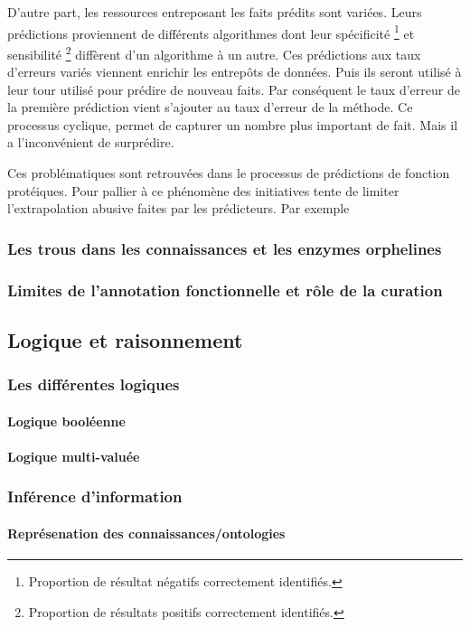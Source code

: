 \begin{refsection}
    D’autre part, les ressources entreposant les faits prédits sont variées. Leurs prédictions proviennent  de différents algorithmes dont leur spécificité \footnote{Proportion de résultat négatifs correctement identifiés.} et sensibilité \footnote{Proportion de résultats positifs correctement identifiés.} diffèrent d’un algorithme à un autre. Ces prédictions aux taux d’erreurs variés viennent enrichir les entrepôts de données. Puis ils seront utilisé à leur tour utilisé pour prédire de nouveau faits. Par conséquent  le taux d’erreur de la première prédiction vient s’ajouter au taux d’erreur de la méthode. Ce processus cyclique, permet de capturer un nombre plus important de fait. Mais il a l’inconvénient de surprédire.
    
    Ces problématiques sont retrouvées dans le processus de prédictions de fonction protéiques.
    Pour pallier à ce phénomène des initiatives tente de limiter l’extrapolation abusive faites par les prédicteurs. Par exemple \citeauthor{pfeiffer2015manual}
    
    
    \subsubsection{Les trous dans les connaissances et les enzymes orphelines}
    \subsubsection{Limites de l’annotation fonctionnelle et rôle de la curation}
    \subsection{Logique et raisonnement}
    \subsubsection{Les différentes logiques}
    \paragraph{Logique booléenne}
    \paragraph{Logique multi-valuée}
    \subsubsection{Inférence d’information}
    \paragraph{Représenation des connaissances/ontologies}

\end{refsection}
